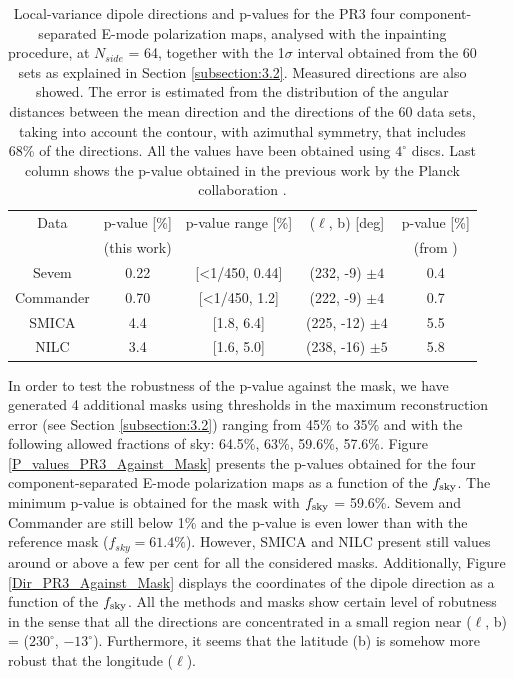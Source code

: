 {\begin{table}[t!]
\centering
\begin{tabular}{ccccc}
\hline
Data      & p-value {[}\%{]} & p-value range {[}\%{]}       & ($\ell$, b) {[}deg{]} & p-value {[}\%{]} \\
& (this work) & & &  (from \cite{Planck:2019evm} )
\\ \hline
Sevem     & 0.22                         & {[}\textless{}1/450, 0.44{]} & (232, -9) $\pm 4$     & 0.4              \\
Commander & 0.70                         & {[}\textless{}1/450, 1.2{]}  & (222, -9) $\pm 4$     & 0.7              \\
SMICA     & 4.4                          & {[}1.8, 6.4{]}               & (225, -12) $\pm 4$    & 5.5              \\
NILC      & 3.4                          & {[}1.6, 5.0{]}               & (238, -16) $\pm 5$    & 5.8              \\ \hline
\end{tabular}
\caption{Local-variance dipole directions and p-values for the PR3 four component-separated E-mode polarization maps, analysed with the inpainting procedure, at $N_{side}$ = 64, together with the 1$\sigma$ interval obtained from the 60 sets as explained in Section \ref{subsection:3.2}. Measured directions are also showed. The error is estimated from the distribution of the angular distances between the mean direction and the directions of the 60 data sets, taking into account the contour, with azimuthal symmetry, that includes 68\% of the directions. All the values have been obtained using $4^{\circ}$ discs. Last column shows the p-value obtained in the previous work by the Planck collaboration \cite{Planck:2019evm}.}
\label{PR3_Results}
\end{table}

In order to test the robustness of the p-value against the mask, we have generated 4 additional masks using thresholds in the maximum reconstruction error (see Section \ref{subsection:3.2}) ranging from 45\% to 35\% and with the following allowed fractions of sky: 64.5\%, 63\%, 59.6\%, 57.6\%. Figure \ref{P_values_PR3_Against_Mask} presents the p-values obtained for the four component-separated E-mode polarization maps as a function of the $f_{\rm sky}$. The minimum p-value is obtained for the mask with $f_{\rm sky}$ = 59.6\%. Sevem and Commander are still below 1\% and the p-value is even lower than with the reference mask ($f_{sky} = 61.4\%$). However, SMICA and NILC present still values around or above a few per cent for all the considered masks. Additionally, Figure \ref{Dir_PR3_Against_Mask} displays the coordinates of the dipole direction as a function of the $f_{\rm sky}$. All the methods and masks show certain level of robutness in the sense that all the directions are concentrated in a small region near ($\ell$, b) = ($230^{\circ}$, $-13^{\circ}$). Furthermore, it seems that the latitude (b) is somehow more robust that the longitude ($\ell$).

}
